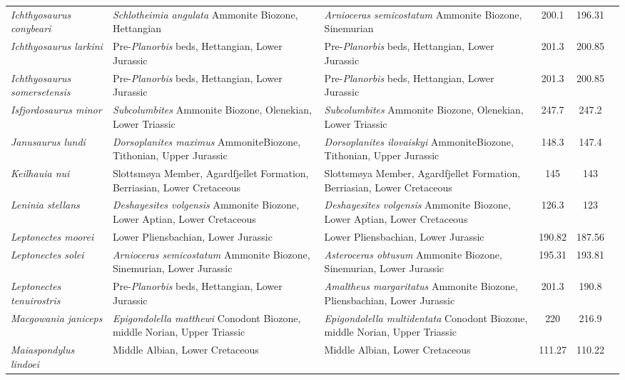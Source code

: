 \begin{longtabu}{>{\itshape}lXXSSl}
	Ichthyosaurus conybeari & \emph{Schlotheimia angulata} Ammonite Biozone, Hettangian & \emph{Arnioceras semicostatum} Ammonite Biozone, Sinemurian & 200.1 & 196.31 & \cite{McGowan1974a} \\
	Ichthyosaurus larkini & Pre-\emph{Planorbis} beds, Hettangian, Lower Jurassic & Pre-\emph{Planorbis} beds, Hettangian, Lower Jurassic & 201.3 & 200.85 & \cite{Lomax2017} \\
	Ichthyosaurus somersetensis & Pre-\emph{Planorbis} beds, Hettangian, Lower Jurassic & Pre-\emph{Planorbis} beds, Hettangian, Lower Jurassic & 201.3 & 200.85 & \cite{Lomax2017} \\
	Isfjordosaurus minor & \emph{Subcolumbites} Ammonite Biozone, Olenekian, Lower Triassic & \emph{Subcolumbites} Ammonite Biozone, Olenekian, Lower Triassic & 247.7 & 247.2 & \cite{Wiman1910} \\
	Janusaurus lundi & \emph{Dorsoplanites maximus} AmmoniteBiozone, Tithonian, Upper Jurassic & \emph{Dorsoplanites ilovaiskyi} AmmoniteBiozone, Tithonian, Upper Jurassic & 148.3 & 147.4 & \cite{Roberts2014} \\
	Keilhauia nui & Slottsmøya Member, Agardfjellet Formation, Berriasian, Lower Cretaceous & Slottsmøya Member, Agardfjellet Formation, Berriasian, Lower Cretaceous & 145 & 143 & \cite{Delsett2017} \\
	Leninia stellans & \emph{Deshayesites volgensis} Ammonite Biozone, Lower Aptian, Lower Cretaceous & \emph{Deshayesites volgensis} Ammonite Biozone, Lower Aptian, Lower Cretaceous & 126.3 & 123 & \cite{Fischer2014} \\
	Leptonectes moorei & Lower Pliensbachian, Lower Jurassic & Lower Pliensbachian, Lower Jurassic & 190.82 & 187.56 & \cite{McGowan1999a} \\
	Leptonectes solei & \emph{Arnioceras semicostatum} Ammonite Biozone, Sinemurian, Lower Jurassic & \emph{Asteroceras obtusum} Ammonite Biozone, Sinemurian, Lower Jurassic & 195.31 & 193.81 & \cite{McGowan1993} \\
	Leptonectes tenuirostris & Pre-\emph{Planorbis} beds, Hettangian, Lower Jurassic & \emph{Amaltheus margaritatus} Ammonite Biozone, Pliensbachian, Lower Jurassic & 201.3 & 190.8 & \cite{McGowan1989,McGowan2003} \\
	Macgowania janiceps & \emph{Epigondolella matthewi} Conodont Biozone, middle Norian, Upper Triassic & \emph{Epigondolella multidentata} Conodont Biozone, middle Norian, Upper Triassic & 220 & 216.9 & \cite{McGowan1996} \\
	Maiaspondylus lindoei & Middle Albian, Lower Cretaceous & Middle Albian, Lower Cretaceous & 111.27 & 110.22 & \cite{Maxwell2006a} \\

\end{longtabu}
